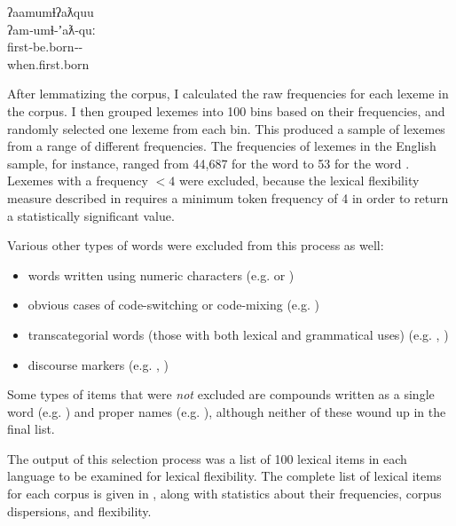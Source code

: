 \begin{exe}
  \ex\label{ex:3.1}
  \gllll ʔaamumɬʔaƛquu\\
         ʔam‑umɬ‑ʼaƛ‑quː\\
         first‑be.born‑‑\\
         when.first.born\\
\end{exe}

After lemmatizing the corpus, I calculated the raw frequencies for each lexeme in the corpus. I then grouped lexemes into 100 bins based on their frequencies, and randomly selected one lexeme from each bin. This produced a sample of lexemes from a range of different frequencies. The frequencies of lexemes in the English sample, for instance, ranged from 44,687 for the word  to 53 for the word . Lexemes with a frequency $<4$ were excluded, because the lexical flexibility measure described in  requires a minimum token frequency of 4 in order to return a statistically significant value.

Various other types of words were excluded from this process as well:

\begin{itemize}

  \singlespacing

  \item words written using numeric characters (e.g.  or )

  \item obvious cases of code-switching or code-mixing (e.g.  )

  \item transcategorial words (those with both lexical and grammatical uses) (e.g. , )

  \item discourse markers (e.g. , )

\end{itemize}

\noindent Some types of items that were \emph{not} excluded are compounds written as a single word (e.g. ) and proper names (e.g. ), although neither of these wound up in the final list.

The output of this selection process was a list of 100 lexical items in each language to be examined for lexical flexibility. The complete list of lexical items for each corpus is given in , along with statistics about their frequencies, corpus dispersions, and flexibility.

